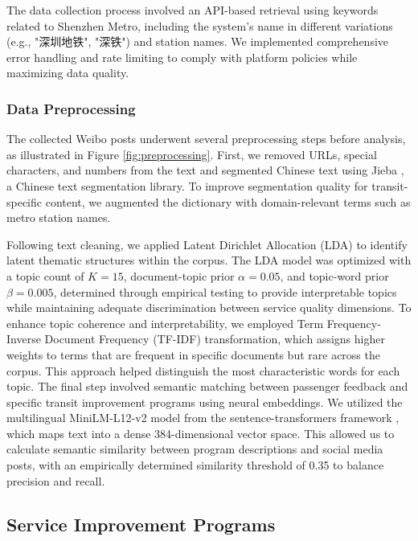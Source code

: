 \documentclass[a4paper,fleqn,12pt]{cas-sc}
\begin{document}
The data collection process involved an API-based retrieval using keywords related to Shenzhen Metro, including the system's name in different variations (e.g., "深圳地铁", "深铁") and station names. We implemented comprehensive error handling and rate limiting to comply with platform policies while maximizing data quality.

\subsubsection{Data Preprocessing}

The collected Weibo posts underwent several preprocessing steps before analysis, as illustrated in Figure \ref{fig:preprocessing}. First, we removed URLs, special characters, and numbers from the text and segmented Chinese text using Jieba \citep{sun2012jieba}, a Chinese text segmentation library. To improve segmentation quality for transit-specific content, we augmented the dictionary with domain-relevant terms such as metro station names.

Following text cleaning, we applied Latent Dirichlet Allocation (LDA) to identify latent thematic structures within the corpus. The LDA model was optimized with a topic count of $K = 15$, document-topic prior $\alpha = 0.05$, and topic-word prior $\beta = 0.005$, determined through empirical testing to provide interpretable topics while maintaining adequate discrimination between service quality dimensions. To enhance topic coherence and interpretability, we employed Term Frequency-Inverse Document Frequency (TF-IDF) transformation, which assigns higher weights to terms that are frequent in specific documents but rare across the corpus. This approach helped distinguish the most characteristic words for each topic. The final step involved semantic matching between passenger feedback and specific transit improvement programs using neural embeddings. We utilized the multilingual MiniLM-L12-v2 model from the sentence-transformers framework \citep{reimers2019sentence}, which maps text into a dense 384-dimensional vector space. This allowed us to calculate semantic similarity between program descriptions and social media posts, with an empirically determined similarity threshold of 0.35 to balance precision and recall.

\subsection{Service Improvement Programs}
\end{document}
